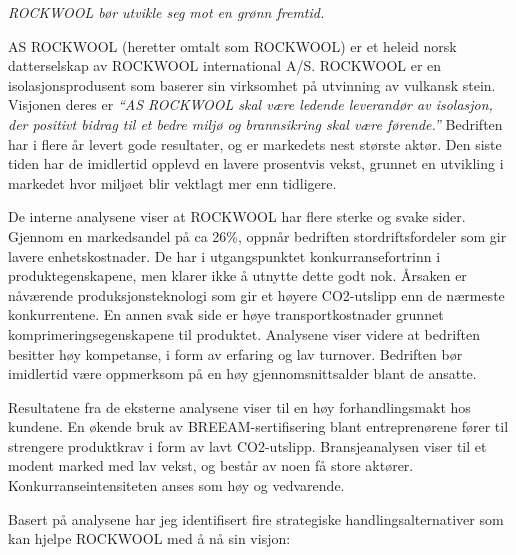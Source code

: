 \textit{ROCKWOOL bør utvikle seg mot en grønn fremtid.}

\indent \newline
AS ROCKWOOL (heretter omtalt som ROCKWOOL) er et heleid norsk datterselskap av ROCKWOOL international A/S. ROCKWOOL er en isolasjonsprodusent som baserer sin virksomhet på utvinning av vulkansk stein. Visjonen deres er \textit{\textquotedblleft AS ROCKWOOL skal være ledende leverandør av isolasjon, der positivt bidrag til et bedre miljø og brannsikring skal være førende.\textquotedblright} Bedriften har i flere år levert gode resultater, og er markedets nest største aktør. Den siste tiden har de imidlertid opplevd en lavere prosentvis vekst, grunnet en utvikling i markedet hvor miljøet blir vektlagt mer enn tidligere.

\indent \newline
De interne analysene viser at ROCKWOOL har flere sterke og svake sider. Gjennom en markedsandel på ca 26\%, oppnår bedriften stordriftsfordeler som gir lavere enhetskostnader. De har i utgangspunktet konkurransefortrinn i produktegenskapene, men klarer ikke å utnytte dette godt nok. Årsaken er nåværende produksjonsteknologi som gir et høyere CO2-utslipp enn de nærmeste konkurrentene. En annen svak side er høye transportkostnader grunnet komprimeringsegenskapene til produktet. Analysene viser videre at bedriften besitter høy kompetanse, i form av erfaring og lav turnover. Bedriften bør imidlertid være oppmerksom på en høy gjennomsnittsalder blant de ansatte. 

\indent \newline
Resultatene fra de eksterne analysene viser til en høy forhandlingsmakt hos kundene. En økende bruk av BREEAM-sertifisering blant entreprenørene fører til strengere produktkrav i form av lavt CO2-utslipp. Bransjeanalysen viser til et modent marked med lav vekst, og består av noen få store aktører. Konkurranseintensiteten anses som høy og vedvarende. 

\indent \newline
Basert på analysene har jeg identifisert fire strategiske handlingsalternativer som kan hjelpe ROCKWOOL med å nå sin visjon:

